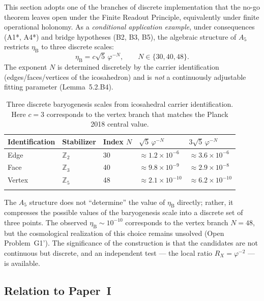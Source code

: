 \documentclass[sn-mathphys-num,Numbered]{sn-jnl}
\theoremstyle{thmstyleone}
\theoremstyle{thmstylethree}
\theoremstyle{thmstyletwo}
\newcommand{\etaB}{\eta_{\mathrm{B}}}
\begin{document}
This section adopts one of the branches of discrete implementation that
the no-go theorem leaves open under the Finite Readout Principle,
equivalently under finite operational holonomy. As a
\emph{conditional application example}, under consequences (A1*, A4*)
and bridge hypotheses (B2, B3, B5), the algebraic structure of $A_5$
restricts $\etaB$ to three discrete scales:
\begin{equation}
  \etaB = c\sqrt{5}\,\varphi^{-N},
  \qquad N \in \{30, 40, 48\}.
\end{equation}
The exponent $N$ is determined discretely by the carrier identification
(edges/faces/vertices of the icosahedron) and is \emph{not} a
continuously adjustable fitting parameter (Lemma~5.2.B4).

\begin{table}[h]
\caption{Three discrete baryogenesis scales from icosahedral carrier
identification. Here $c = 3$ corresponds to the vertex branch that
matches the Planck 2018 central value.}
\label{tab:three-scales}
\begin{tabular}{@{}llll l@{}}
\toprule
Identification & Stabilizer & Index $N$ &
  $\sqrt{5}\,\varphi^{-N}$ & $3\sqrt{5}\,\varphi^{-N}$ \\
\midrule
Edge   & $\mathbb{Z}_2$ & 30 &
  $\approx 1.2\times10^{-6}$  & $\approx 3.6\times10^{-6}$ \\
Face   & $\mathbb{Z}_3$ & 40 &
  $\approx 9.8\times10^{-9}$  & $\approx 2.9\times10^{-8}$ \\
Vertex & $\mathbb{Z}_5$ & 48 &
  $\approx 2.1\times10^{-10}$ & $\approx 6.2\times10^{-10}$ \\
\botrule
\end{tabular}
\end{table}

The $A_5$ structure does not ``determine'' the value of $\etaB$
directly; rather, it compresses the possible values of the baryogenesis
scale into a discrete set of three points. The observed
$\etaB \sim 10^{-10}$ corresponds to the vertex branch $N=48$, but
the cosmological realization of this choice remains unsolved (Open
Problem~G1'). The significance of the construction is that the
candidates are not continuous but discrete, and an independent test ---
the local ratio $R_X = \varphi^{-2}$ --- is available.

\subsection{Relation to Paper~I}
\label{ssec:relation}
\end{document}
